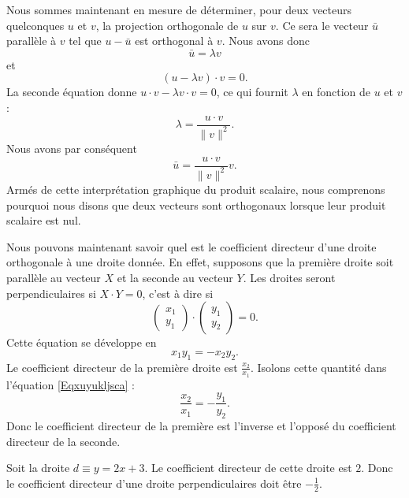 Nous sommes maintenant en mesure de déterminer, pour deux vecteurs quelconques $u$ et $v$, la projection orthogonale de $u$ sur $v$. Ce sera le vecteur $\bar u$ parallèle à $v$ tel que $u-\bar u$ est orthogonal à $v$. Nous avons donc
\begin{equation}
    \bar u=\lambda v
\end{equation}
et 
\begin{equation}
    (u-\lambda v)\cdot v=0.
\end{equation}
La seconde équation donne $u\cdot v-\lambda v\cdot v=0$, ce qui fournit $\lambda$ en fonction de $u$ et $v$ :
\begin{equation}
    \lambda=\frac{ u\cdot v }{ \| v \|^2 }.
\end{equation}
Nous avons par conséquent
\begin{equation}
    \bar u=\frac{ u\cdot v }{ \| v \|^2 }v.
\end{equation}
Armés de cette interprétation graphique du produit scalaire, nous comprenons pourquoi nous disons que deux vecteurs sont orthogonaux lorsque leur produit scalaire est nul.

Nous pouvons maintenant savoir quel est le coefficient directeur d'une droite orthogonale à une droite donnée. En effet, supposons que la première droite soit parallèle au vecteur $X$ et la seconde au vecteur $Y$. Les droites seront perpendiculaires si $X\cdot Y=0$, c'est à dire si
\begin{equation}
	\begin{pmatrix}
		x_1	\\ 
		y_1	
	\end{pmatrix}\cdot\begin{pmatrix}
		y_1	\\ 
		y_2	
	\end{pmatrix}=0.
\end{equation}
Cette équation se développe en 
\begin{equation}		\label{Eqxuyukljsca}
	x_1y_1=-x_2y_2.
\end{equation}
Le coefficient directeur de la première droite est $\frac{ x_2 }{ x_1 }$. Isolons cette quantité dans l'équation \eqref{Eqxuyukljsca} :
\begin{equation}
	\frac{ x_2 }{ x_1 }=-\frac{ y_1 }{ y_2 }.
\end{equation}
Donc le coefficient directeur de la première est l'inverse et l'opposé du coefficient directeur de la seconde.

\begin{example}
	Soit la droite $d\equiv y=2x+3$. Le coefficient directeur de cette droite est $2$. Donc le coefficient directeur d'une droite perpendiculaires doit être $-\frac{ 1 }{ 2 }$.
\end{example}


